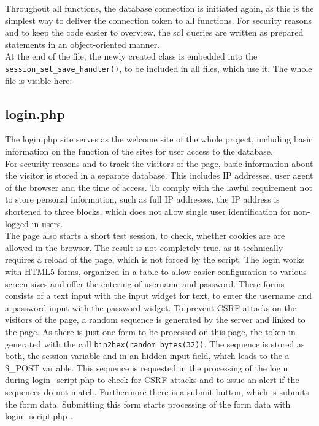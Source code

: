 Throughout all functions, the database connection is initiated again, as this is the simplest way to deliver the connection token to all functions. For security reasons and to keep the code easier to 
overview, the sql queries are written as prepared statements in an object-oriented manner.\\
At the end of the file, the newly created class is embedded into the \texttt{session\_set\_save\_handler()}, to be included in all files, which use it.
The whole file is visible here:


\subsection{login.php}
The login.php site serves as the welcome site of the whole project, including basic information on the function of the sites for user access to the database.\\
For security reasons and to track the visitors of the page, basic information about the visitor is stored in a separate database. This includes IP addresses, user agent of 
the browser and the time of access. To comply with the lawful requirement not to store personal information, such as full IP addresses, the IP address is shortened to three blocks,
which does not allow single user identification for non-logged-in users.\\
The page also starts a short test session, to check, whether cookies are are allowed in the browser. The result is not completely true, as it technically requires a reload of the 
page, which is not forced by the script.
The login works with HTML5 forms, organized in a table to allow easier configuration to various screen sizes and offer the entering of username and password. 
These forms consists of a text input with the input widget for text, to enter the username and a password input with the 
password widget. To prevent CSRF-attacks on the visitors of the page, a random sequence is generated by the server and linked to the page. As there is just one form to be processed on this page, the 
token in generated with the call \texttt{bin2hex(random\_bytes(32))}. The sequence is stored as both, the session variable and in an hidden input field, which leads to the a \$\_POST variable. 
This sequence is requested in the processing of the login during login\_script.php to check for CSRF-attacks and to issue an alert if the sequences do not match. 
Furthermore there is a submit button, which is submits the form data. Submitting this form starts processing of the form data with login\_script.php .

